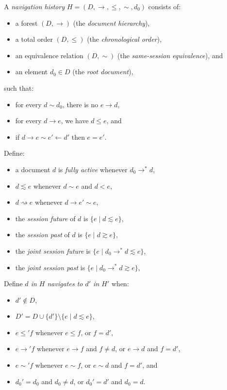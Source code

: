 \documentclass{article}
\newcommand{\aNH}{H}
\newcommand{\Docs}{D}
\newcommand{\parentOf}{\rightarrow}
\newcommand{\childOf}{\leftarrow}
\newcommand{\leChron}{\le}
\newcommand{\ltChron}{<}
\newcommand{\eqSess}{\sim}
\newcommand{\ltSess}{\lesssim}
\newcommand{\gtSess}{\gtrsim}
\newcommand{\parentOfSess}{\rightsquigarrow}
\newcommand{\rootDoc}{d_0}
\newcommand{\aDoc}{d}
\newcommand{\bDoc}{e}
\newcommand{\cDoc}{f}
\begin{document}
A \emph{navigation history} $\aNH=(\Docs,{\parentOf},{\leChron},{\eqSess},{\rootDoc})$ consists of:
\begin{itemize}
\item a forest $(\Docs,{\parentOf})$ (the \emph{document hierarchy}),
\item a total order $(\Docs,{\leChron})$ (the \emph{chronological order}),
\item an equivalence relation $(\Docs,{\eqSess})$ (the \emph{same-session equivalence}), and
\item an element $\rootDoc \in \Docs$ (the \emph{root document}),
\end{itemize}
such that:
\begin{itemize}
\item for every $\aDoc \eqSess \rootDoc$, there is no $\bDoc \parentOf \aDoc$,
\item for every $\aDoc \parentOf \bDoc$, we have $\aDoc \leChron \bDoc$, and
\item if $\aDoc \parentOf \bDoc \eqSess \bDoc' \childOf \aDoc'$
   then $\bDoc=\bDoc'$.
\end{itemize}
Define:
\begin{itemize}
\item a document $\aDoc$ is \emph{fully active} whenever $\rootDoc \parentOf^* \aDoc$,
\item $\aDoc \ltSess \bDoc$ whenever $\aDoc \eqSess \bDoc$ and $\aDoc \ltChron \bDoc$,
\item $\aDoc \parentOfSess \bDoc$ whenever $\aDoc \parentOf \bDoc' \eqSess \bDoc$,
\item the \emph{session future} of $\aDoc$ is $\{ \bDoc \mid \aDoc \ltSess \bDoc \}$,
\item the \emph{session past} of $\aDoc$ is $\{ \bDoc \mid \aDoc \gtSess \bDoc \}$,
\item the \emph{joint session future} is $\{ \bDoc \mid \rootDoc \parentOf^* \aDoc \ltSess \bDoc \}$,
\item the \emph{joint session past} is $\{ \bDoc \mid \rootDoc \parentOf^* \aDoc \gtSess \bDoc \}$,
\end{itemize}
Define \emph{$\aDoc$ in $\aNH$ navigates to $\aDoc'$ in $\aNH'$} when:
\begin{itemize}
\item $\aDoc'\notin\Docs$,
\item $\Docs' = \Docs \cup \{\aDoc'\} \setminus \{ \bDoc \mid \aDoc \ltSess \bDoc \}$,
\item $\bDoc \leChron' \cDoc$ whenever
  $\bDoc \leChron \cDoc$, or $\cDoc = \aDoc'$,
\item $\bDoc \parentOf' \cDoc$ whenever
  $\bDoc \parentOf \cDoc$ and $\cDoc \neq \aDoc$, or
  $\bDoc \parentOf \aDoc$ and $\cDoc = \aDoc'$,
\item $\bDoc \eqSess' \cDoc$ whenever
  $\bDoc \eqSess \cDoc$, or
  $\bDoc \eqSess \aDoc$ and $\cDoc = \aDoc'$, and
\item $\rootDoc' = \rootDoc$ and $\rootDoc \neq \aDoc$, or
  $\rootDoc' = \aDoc'$ and $\rootDoc = \aDoc$.
\end{itemize}
\end{document}
